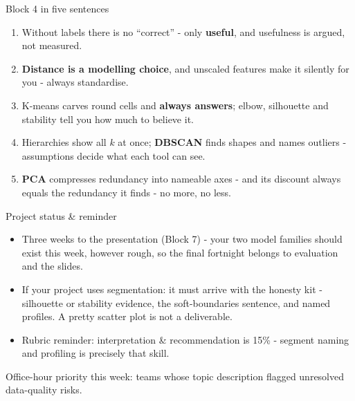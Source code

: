 \documentclass[10pt,aspectratio=169]{beamer}
\begin{document}
\begin{frame}{Block 4 in five sentences}
  \begin{enumerate}
    \item Without labels there is no ``correct'' - only \textbf{useful},
          and usefulness is argued, not measured.
    \item \textbf{Distance is a modelling choice}, and unscaled features
          make it silently for you - always standardise.
    \item K-means carves round cells and \textbf{always answers};
          elbow, silhouette and stability tell you how much to believe it.
    \item Hierarchies show all $k$ at once; \textbf{DBSCAN} finds shapes
          and names outliers - assumptions decide what each tool can see.
    \item \textbf{PCA} compresses redundancy into nameable axes - and
          its discount always equals the redundancy it finds - no more, no less.
  \end{enumerate}
\end{frame}

\begin{frame}{Project status \& reminder}
  \begin{itemize}
    \item Three weeks to the presentation (Block 7) - your two model
          families should exist \alert{this week}, however rough, so the
          final fortnight belongs to evaluation and the slides.
    \item If your project uses segmentation: it must arrive with the
          honesty kit - silhouette or stability evidence, the
          soft-boundaries sentence, and named profiles. A pretty scatter
          plot is not a deliverable.
    \item Rubric reminder: interpretation \& recommendation is 15\% -
          segment naming and profiling is precisely that skill.
  \end{itemize}
  \vspace{0.5em}
  \begin{center}\small
    Office-hour priority this week: teams whose topic description flagged
    unresolved data-quality risks.
  \end{center}
\end{frame}
\end{document}
